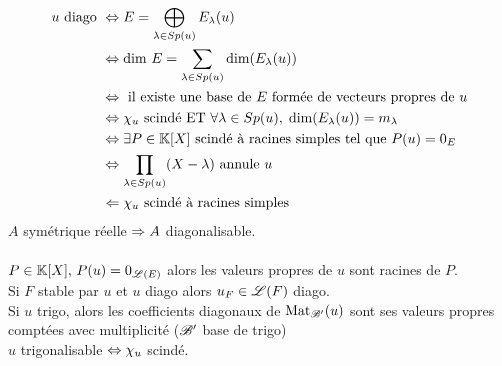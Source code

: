 \documentclass[12 pt]{book}
\begin{document}
\begin{equation*}
\begin{aligned}
u \text{ diago } & \Leftrightarrow E = \bigoplus_{\lambda \in Sp(u)} E_\lambda(u)\\
& \Leftrightarrow \text{dim } E = \sum_{\lambda\in Sp(u)} \text{dim}(E_\lambda(u))\\
&\Leftrightarrow \text{ il existe une base de $E$ formée de vecteurs propres de $u$}\\
& \Leftrightarrow \chi_u \text{ scindé ET } \forall \lambda \in Sp(u), \; \text{dim}(E_\lambda(u)) = m_\lambda\\
&\Leftrightarrow \exists P\in\mathbb{K}[X] \text{ scindé à racines simples tel que } P(u) = 0_E\\
&\Leftrightarrow \prod_{\lambda \in Sp(u)} (X-\lambda)\text{ annule } u\\
&\Leftarrow \chi_u \text{ scindé à racines simples}\\
\end{aligned}
\end{equation*}
$A$ symétrique réelle $\Rightarrow A$ diagonalisable.\\
\text{}\\
$P\in \mathbb{K}[X], \, P(u) = 0_{\mathscr{L}(E)}$ alors les valeurs propres de $u$ sont racines de $P$.\\
Si $F$ stable par $u$ et $u$ diago alors $u_F\in \mathscr{L}(F)$ diago.\\
Si $u$ trigo, alors les coefficients diagonaux de $\text{Mat}_{\mathscr{B}'}(u)$ sont ses valeurs propres comptées avec multiplicité ($\mathscr{B}'$ base de trigo)\\
$u$ trigonalisable $\Leftrightarrow \chi_u$ scindé.\\
\end{document}
